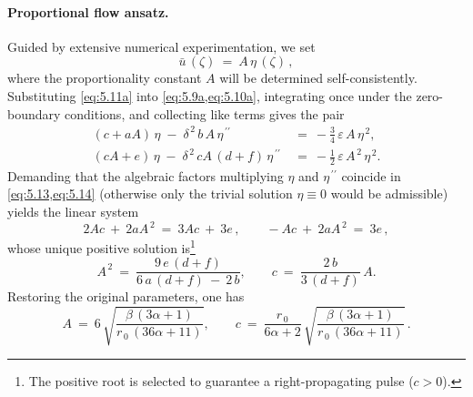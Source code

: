 \documentclass[alpha-refs, 12pt]{wiley-article}
\newcommand{\eps}{\varepsilon}
\begin{document}
\paragraph{Proportional flow ansatz.} Guided by extensive numerical experimentation, we set
\begin{equation}\label{eq:5.11a}
  \bar{u}\,(\zeta)\ =\ A\,\eta\,(\zeta)\,,
\end{equation}
where the proportionality constant $A$ will be determined self-consistently. Substituting \cref{eq:5.11a} into \cref{eq:5.9a,eq:5.10a}, integrating once under the zero-boundary conditions, and collecting like terms gives the pair
\begin{align}
  (c+aA)\,\eta \;-\;\delta^{\,2}\,b\,A\,\eta^{\,\prime\prime}\ &=\ -\frac{3}{4}\,\eps\,A\,\eta^{\,2}, \label{eq:5.13} \\
  (cA+e)\,\eta \;-\;\delta^{\,2}\,cA\,(d+f)\,\eta^{\,\prime\prime}\ &=\ -\frac{1}{2}\,\eps\,A^{\,2}\,\eta^{\,2}. \label{eq:5.14}
\end{align}
Demanding that the algebraic factors multiplying $\eta$ and $\eta^{\,\prime\prime}$ coincide in \cref{eq:5.13,eq:5.14} (otherwise only the trivial solution $\eta\equiv0$ would be admissible) yields the linear system
\begin{equation}\label{eq:compat}
  2Ac\ +\ 2aA^{\,2}\ =\ 3Ac\ +\ 3e\,, \qquad -Ac\ +\ 2aA^{\,2}\ =\ 3e\,,
\end{equation}
whose unique positive solution is\footnote{The positive root is selected to guarantee a right-propagating pulse ($c>0$).}
\begin{equation*}
  A^{\,2}\ =\ \frac{9\,e\,(d+f)}{6\,a\,(d+f)\ -\ 2\,b}, \qquad c\ =\ \frac{2\,b}{3\,(d+f)}\,A.
\end{equation*}
Restoring the original parameters, one has
\begin{equation}\label{eq:rad:soli:A:c}
  A\ =\ 6\,\sqrt{\frac{\beta\,(3\alpha+1)}{r_{\,0}\,(36\alpha+11)}}, \qquad
  c\ =\ \frac{r_{\,0}}{6\alpha+2}\,\sqrt{\frac{\beta\,(3\alpha+1)}{r_{\,0}\,(36\alpha+11)}}\,.
\end{equation}
\end{document}
